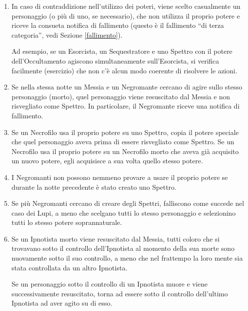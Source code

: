 \documentclass[a4paper,10pt]{article}
\begin{document}
\begin{enumerate}
 
 \item In caso di contraddizione nell'utilizzo dei poteri, viene scelto
casualmente un personaggio (o più di uno, se necessario), che non utilizza il
proprio potere e riceve la consueta notifica di fallimento (questo è il
fallimento ``di terza categoria'', vedi Sezione \ref{fallimento}).
 
 Ad esempio, se un Esorcista, un Sequestratore e uno Spettro con il potere
dell'Occultamento agiscono simultaneamente sull'Esorcista, si verifica
facilmente (esercizio) che non c'è alcun modo coerente di risolvere le azioni.
  
 \item Se nella stessa notte un Messia e un Negromante cercano di agire sullo
stesso personaggio (morto), quel personaggio viene resuscitato dal Messia e non
risvegliato come Spettro. In particolare, il Negromante riceve una notifica di
fallimento.

 \item Se un Necrofilo usa il proprio potere su uno Spettro, copia il potere
speciale che quel personaggio aveva prima di essere risvegliato come Spettro.
 Se un Necrofilo usa il proprio potere su un Necrofilo morto che aveva già
acquisito un nuovo potere, egli acquisisce a sua volta quello stesso potere.
 
 \item I Negromanti non possono nemmeno provare a usare il proprio potere se
durante la notte precedente è stato creato uno Spettro.
 
 \item Se più Negromanti cercano di creare degli Spettri, falliscono come
succede nel caso dei Lupi, a meno che scelgano tutti lo stesso personaggio e
selezionino tutti lo stesso potere soprannaturale.

 \item Se un Ipnotista morto viene resuscitato dal Messia, tutti coloro che si
trovavano sotto il controllo dell'Ipnotista al momento della sua morte sono
nuovamente sotto il suo controllo, a meno che nel frattempo la loro mente sia
stata controllata da un altro Ipnotista.
 
 Se un personaggio sotto il controllo di un Ipnotista muore e viene
successivamente resuscitato, torna ad essere sotto il controllo dell'ultimo
Ipnotista ad aver agito su di esso.
 

\end{enumerate}
\end{document}

